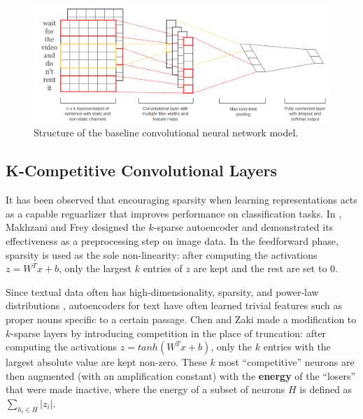 \documentclass{vldb}
\begin{document}
\begin{figure}[h]
\includegraphics[width=\linewidth]{cnn.png}
\caption{\textmd{Structure of the baseline convolutional neural network model.}}
\end{figure}

\subsection{K-Competitive Convolutional Layers}
It has been observed that encouraging sparsity when learning representations acts as a capable reguarlizer that improves performance on classification tasks. In \cite{MakhzaniF13}, Makhzani and Frey designed the $k$-sparse autoencoder and demonstrated its effectiveness as a preprocessing step on image data. In the feedforward phase, sparsity is used as the sole non-linearity: after computing the activations $z = W^Tx + b$, only the largest $k$ entries of $z$ are kept and the rest are set to 0. 

Since textual data often has high-dimensionality, sparsity, and power-law distributions \cite{KATE}, autoencoders for text have often learned trivial features such as proper nouns specific to a certain passage. Chen and Zaki made a modification to $k$-sparse layers by introducing competition in the place of truncation: after computing the activations $z = tanh(W^Tx + b)$, only the $k$ entries with the largest absolute value are kept non-zero. These $k$ most ``competitive'' neurons are then augmented (with an amplification constant) with the \textbf{energy} of the ``losers'' that were made inactive, where the energy of a subset of neurons $H$ is defined as $\sum_{h_i \in H} |z_i|$. 
\end{document}
